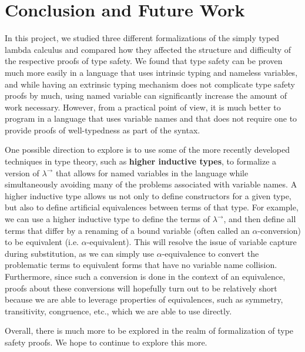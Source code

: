 \documentclass[12pt, letterpaper]{article}
\begin{document}
\section{Conclusion and Future Work}

In this project, we studied three different formalizations of the simply typed lambda calculus and compared how they affected the structure and difficulty of the respective proofs of type safety. We found that type safety can be proven much more easily in a language that uses intrinsic typing and nameless variables, and while having an extrinsic typing mechanism does not complicate type safety proofs by much, using named variable can significantly increase the amount of work necessary. However, from a practical point of view, it is much better to program in a language that uses variable names and that does not require one to provide proofs of well-typedness as part of the syntax. 

One possible direction to explore is to use some of the more recently developed techniques in type theory, such as \textbf{higher inductive types}, to formalize a version of $\lambda^{\to}$ that allows for named variables in the language while simultaneously avoiding many of the problems associated with variable names. A higher inductive type allows us not only to define constructors for a given type, but also to define artificial equivalences between terms of that type. For example, we can use a higher inductive type to define the terms of $\lambda^{\to}$, and then define all terms that differ by a renaming of a bound variable (often called an $\alpha$-conversion) to be equivalent (i.e. $\alpha$-equivalent). This will resolve the issue of variable capture during substitution, as we can simply use $\alpha$-equivalence to convert the problematic terms to equivalent forms that have no variable name collision. Furthermore, since such a conversion is done in the context of an equivalence, proofs about these conversions will hopefully turn out to be relatively short because we are able to leverage properties of equivalences, such as symmetry, transitivity, congruence, etc., which we are able to use directly.

Overall, there is much more to be explored in the realm of formalization of type safety proofs. We hope to continue to explore this more.




\end{document}
